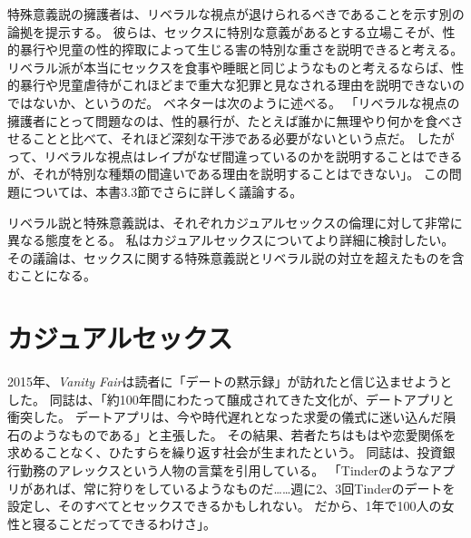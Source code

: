 \documentclass[paper=a4,book,openany]{jlreq}
\begin{document}
特殊意義説の擁護者は、リベラルな視点が退けられるべきであることを示す別の論拠を提示する。
彼らは、セックスに特別な意義があるとする立場こそが、性的暴行や児童の性的搾取によって生じる害の特別な重さを説明できると考える。
リベラル派が本当にセックスを食事や睡眠と同じようなものと考えるならば、性的暴行や児童虐待がこれほどまで重大な犯罪と見なされる理由を説明できないのではないか、というのだ。
ベネターは次のように述べる。
「リベラルな視点の擁護者にとって問題なのは、性的暴行が、たとえば誰かに無理やり何かを食べさせることと比べて、それほど深刻な干渉である必要がないという点だ。
したがって、リベラルな視点はレイプがなぜ間違っているのかを説明することはできるが、それが特別な種類の間違いである理由を説明することはできない」\citep{benatar02:_two_views_sexual_ethic}。
この問題については、本書3.3節でさらに詳しく議論する。

リベラル説と特殊意義説は、それぞれカジュアルセックスの倫理に対して非常に異なる態度をとる。
私はカジュアルセックスについてより詳細に検討したい。
その議論は、セックスに関する特殊意義説とリベラル説の対立を超えたものを含むことになる。

\section{カジュアルセックス}

2015年、\emph{Vanity Fair}は読者に「デートの黙示録」が訪れたと信じ込ませようとした。
同誌は、「約100年間にわたって醸成されてきた文化が、デートアプリと衝突した。
デートアプリは、今や時代遅れとなった求愛の儀式に迷い込んだ隕石のようなものである」と主張した。
その結果、若者たちはもはや恋愛関係を求めることなく、ひたすらを繰り返す社会が生まれたという。
同誌は、投資銀行勤務のアレックスという人物の言葉を引用している。
「Tinderのようなアプリがあれば、常に狩りをしているようなものだ……週に2、3回Tinderのデートを設定し、そのすべてとセックスできるかもしれない。
だから、1年で100人の女性と寝ることだってできるわけさ」\citep{sales15:_tind_dawn_datin_apoc}。
\end{document}
